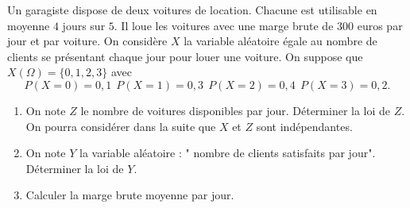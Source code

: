 \documentclass[../PolyS4.tex]{subfiles}
\begin{document}


Un garagiste dispose de deux voitures de location. Chacune est utilisable en moyenne $4$ jours sur $5$. Il loue les voitures avec une marge brute de $300$ euros par jour et par voiture.
On considère $X$ la variable aléatoire égale au nombre de clients se présentant chaque jour pour louer une voiture. On suppose que $X(\Omega)=\{0,1,2,3\}$ avec 
$$P(X=0)=0,1\ \ P(X=1)=0,3\ \ P(X=2)=0,4\ \ P(X=3)=0,2.$$
\begin{enumerate}
\item On note $Z$ le nombre de voitures disponibles par jour. Déterminer la loi de $Z$. On pourra considérer dans la suite que $X$ et $Z$ sont indépendantes.
\item On note $Y$ la variable aléatoire : " nombre de clients satisfaits par jour". Déterminer la loi de $Y$.
\item Calculer la marge brute moyenne par jour.\\
\end{enumerate}


 
\end{document}
